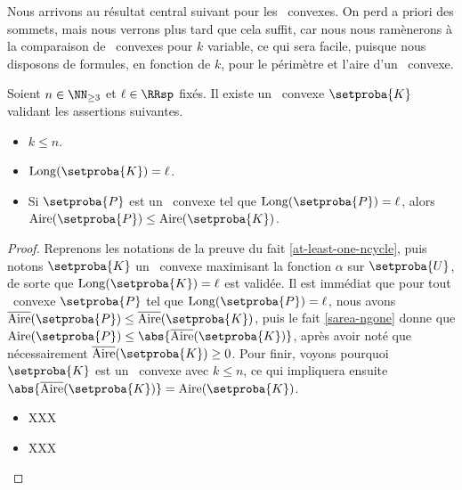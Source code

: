 
\newpage

Nous arrivons au résultat central suivant pour les \ngones\ convexes. On perd a priori des sommets, mais nous verrons plus tard que cela suffit, car nous nous ramènerons à la comparaison de \kregs\ convexes pour $k$ variable, ce qui sera facile, puisque nous disposons de formules, en fonction de $k$, pour le périmètre et l'aire d'un \kreg\ convexe.


\begin{fact} \label{at-least-one-kgone}
    Soient $n \in \NN_{\geq3}$ et $\ell \in \RRsp$ fixés.
    Il existe un \kgone\ convexe $\setproba{K}$ validant les assertions suivantes.
	\begin{itemize}
		\item $k \leq n$.

		\item $\cyclelen{\setproba{K}} = \ell$.

		\item Si $\setproba{P}$ est un \ngone\ convexe tel que $\cyclelen{\setproba{P}} = \ell$, alors $\area{\setproba{P}} \leq \area{\setproba{K}}$.
    \end{itemize}
\end{fact}


\begin{proof}
    Reprenons les notations de la preuve du fait \ref{at-least-one-ncycle}, puis notons $\setproba{K}$ un \ncycle\ convexe maximisant la fonction $\alpha$ sur $\setproba{U}$, de sorte que $\cyclelen{\setproba{K}} = \ell$ est validée.
    Il est immédiat que pour tout \ngone\ convexe $\setproba{P}$ tel que $\cyclelen{\setproba{P}} = \ell$, nous avons $\sarea{\setproba{P}} \leq \sarea{\setproba{K}}$, puis le fait \ref{sarea-ngone} donne que $\area{\setproba{P}} \leq \abs{\sarea{\setproba{K}}}$, après avoir noté que nécessairement $\sarea{\setproba{K}} \geq 0$.
    Pour finir, voyons pourquoi $\setproba{K}$ est un \kgone\ convexe avec $k \leq n$, ce qui impliquera ensuite $\abs{\sarea{\setproba{K}}} = \area{\setproba{K}}$.
	\begin{itemize}
		\item XXX

		\item XXX
    \end{itemize}
	
	\null\vspace{-6ex}
\end{proof}
